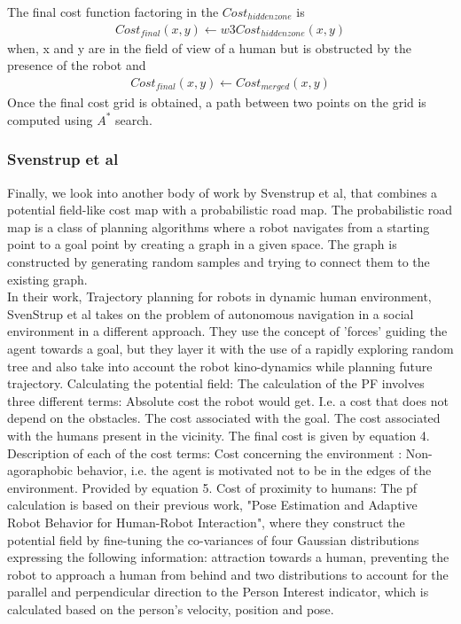 The final cost function factoring in the $Cost_{hidden zone}$ is
\begin{align}
Cost_{final}(x,y) \leftarrow w3 Cost_{hidden zone}(x,y)
\end{align}
when, x and y are in the field of view of a human but is obstructed by the presence of the robot and 
\begin{align}
Cost_{final}(x,y) \leftarrow Cost_{merged}(x,y)
\end{align}
Once the final cost grid is obtained, a path between two points on the grid is computed using $A^*$ search.

\subsubsection*{Svenstrup et al}
Finally, we look into another body of work by Svenstrup et al, that combines a potential field-like cost map with a probabilistic road map. The probabilistic road map is a class of planning algorithms where a robot navigates from a starting point to a goal point by creating a graph in a given space. The graph is constructed by generating random samples and trying to connect them to the existing graph.\\
In their work, Trajectory planning for robots in dynamic human environment, SvenStrup et al takes on the problem of autonomous navigation in a social environment in a different approach. They use the concept of 'forces' guiding the agent towards a goal, but they layer it with the use of a rapidly exploring random tree and also take into account the robot kino-dynamics while planning future trajectory.
Calculating the potential field:
The calculation of the PF involves three different terms:
Absolute cost the robot would get. I.e. a cost that does not depend on the obstacles.	
The cost associated with the goal.
The cost associated with the humans present in the vicinity.
The final cost is given by equation 4.
Description of each of the cost terms:
Cost concerning the environment :
Non-agoraphobic behavior,  i.e. the agent is motivated not to be in the edges of the environment. Provided by equation 5.
Cost of proximity to humans:
The pf calculation is based on their previous work, "Pose Estimation and Adaptive Robot Behavior for Human-Robot Interaction", where they construct the potential field by fine-tuning the co-variances of four Gaussian distributions expressing the following information: attraction towards a human, preventing the robot to approach a human from behind and two distributions to account for the parallel and perpendicular direction to the Person Interest indicator, which is calculated based on the person's velocity, position and pose.  

